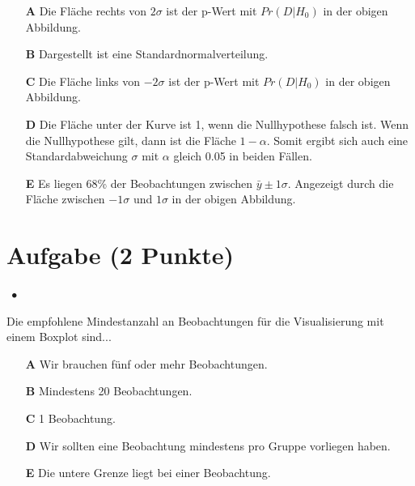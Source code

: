 \documentclass[a4paper, 9pt]{scrartcl}\usepackage[]{graphicx}\usepackage[]{xcolor}
\begin{document}
\begin{enumerate}
\item [\textbf{A} \msquare] Die Fläche rechts von $2\sigma$ ist der p-Wert mit $Pr(D|H_0)$ in der obigen Abbildung.
\item [\textbf{B} \msquare] Dargestellt ist eine Standardnormalverteilung.
\item [\textbf{C} \msquare] Die Fläche links von $-2\sigma$ ist der p-Wert mit $Pr(D|H_0)$ in der obigen Abbildung.
\item [\textbf{D} \msquare] Die Fläche unter der Kurve ist 1, wenn die Nullhypothese falsch ist. Wenn die Nullhypothese gilt, dann ist die Fläche $1-\alpha$. Somit ergibt sich auch eine Standardabweichung $\sigma$ mit $\alpha$ gleich 0.05 in beiden Fällen.
\item [\textbf{E} \msquare] Es liegen 68\% der Beobachtungen zwischen $\bar{y}\pm 1 \sigma$. Angezeigt durch die Fläche zwischen $-1\sigma$ und $1\sigma$ in der obigen Abbildung.
\end{enumerate} 

\section{Aufgabe \hfill (2 Punkte)}

\ifcollection
\begin{flushright}
\tiny\vspace{-2Ex}
\textbf{\examinhaltstart}
\exammodulestatversuch $\;\bullet$
\exammodulebiostat
\vspace{-1Ex}
\end{flushright}
\fi




Die empfohlene Mindestanzahl an Beobachtungen für die Visualisierung mit einem Boxplot sind...



\begin{enumerate}
\item [\textbf{A} \msquare] Wir brauchen fünf oder mehr Beobachtungen.
\item [\textbf{B} \msquare] Mindestens 20 Beobachtungen.
\item [\textbf{C} \msquare] 1 Beobachtung.
\item [\textbf{D} \msquare] Wir sollten eine Beobachtung mindestens pro Gruppe vorliegen haben.
\item [\textbf{E} \msquare] Die untere Grenze liegt bei einer Beobachtung.
\end{enumerate}
\end{document}
